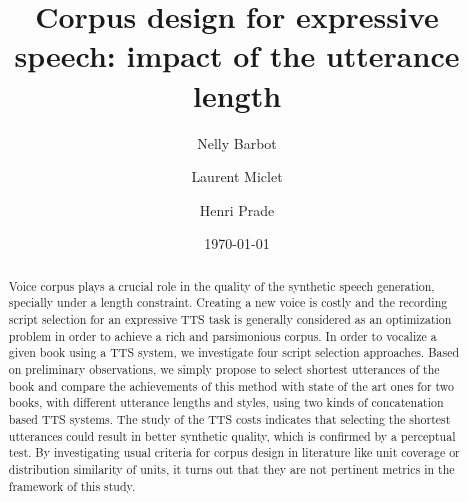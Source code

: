 \documentclass[a4paper]{article}
\title{Corpus design for expressive speech: impact of the utterance length}
\author{Nelly Barbot \and Laurent Miclet \and Henri Prade}
\date{\today}
\begin{document}
\maketitle

\begin{abstract}
  Voice corpus plays a crucial role in the quality of the synthetic speech generation, specially under a length constraint. Creating a new voice is costly and the recording script selection for an expressive TTS task is generally considered as an optimization problem in order to achieve a rich and parsimonious corpus. In order to vocalize a given book using a TTS system, we investigate four script selection approaches. Based on preliminary observations, we simply propose to select shortest utterances of the book and compare the achievements of this method with state of the art ones for two books, with different utterance lengths and styles, using two kinds of concatenation based TTS systems. The study of the TTS costs indicates that selecting the shortest utterances could result in better synthetic quality, which is confirmed by a perceptual test. By investigating usual criteria for corpus design in literature like unit coverage or distribution similarity of units, it turns out that they are not pertinent metrics in the framework of this study. 
\end{abstract}
\end{document}
